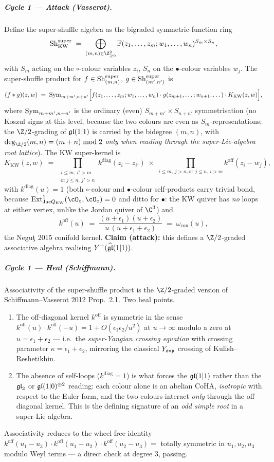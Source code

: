\subparagraph{Cycle 1 --- Attack (Vasserot).} Define the super-shuffle
algebra as the bigraded symmetric-function ring
\[
  \Sh^{\mathrm{super}}_{\mathrm{KW}}
  \;=\;
  \bigoplus_{(m,n)\in\Z_{\geq 0}^2}
  \mathbb F(z_1,\dots,z_m; w_1,\dots,w_n)^{S_m\times S_n},
\]
with $S_m$ acting on the $\circ$-colour variables $z_i$, $S_n$ on the
$\bullet$-colour variables $w_j$. The super-shuffle product for
$f\in\mathrm{Sh}^{\mathrm{super}}_{(m,n)}$, $g\in\mathrm{Sh}^{\mathrm{super}}_{(m',n')}$ is
\[
  (f\ast g)(z,w)
  \;=\;
  \mathrm{Sym}_{m+m',n+n'}
  \Bigl[f(z_1,\dots,z_m;w_1,\dots,w_n)\cdot g(z_{m+1},\dots;w_{n+1},\dots)
       \cdot K_{\mathrm{KW}}(z,w)\Bigr],
\]
where $\mathrm{Sym}_{m+m',n+n'}$ is the ordinary (even) $S_{m+m'}\times S_{n+n'}$
symmetrisation (no Koszul signs at this level, because the two colours
are even as $S_m$-representations; the $\Z/2$-grading of $\mathfrak{gl}(1|1)$ is
carried by the bidegree $(m,n)$, with $\deg_{\Z/2}(m,n) = (m+n)\bmod 2$
\emph{only when reading through the super-Lie-algebra root lattice}). The
KW super-kernel is
\[
  K_{\mathrm{KW}}(z,w)
  \;=\;
  \prod_{\substack{i\leq m,\,i'>m\\\text{or}\ j\leq n,\,j'>n}}
   k^{\mathrm{diag}}(z_i-z_{i'})
  \;\times\;
  \prod_{i\leq m,\,j>n,\text{or }j\leq n,\,i>m}
   k^{\mathrm{off}}(z_i-w_j),
\]
with $k^{\mathrm{diag}}(u) = 1$ (both $\circ$-colour and $\bullet$-colour
self-products carry trivial bond, because $\mathrm{Ext}^1_{\Jac
Q_{\mathrm{KW}}}(\cO_\circ, \cO_\circ) = 0$ and ditto for $\bullet$: the
KW quiver has \emph{no} loops at either vertex, unlike the Jordan quiver
of $\C^3$) and
\[
  k^{\mathrm{off}}(u) \;=\;
  \frac{(u+\epsilon_1)(u+\epsilon_2)}{u\,(u+\epsilon_1+\epsilon_2)}
  \;=\;
  \omega_{\mathrm{con}}(u),
\]
the Negu\c{t} 2015 conifold kernel. \textbf{Claim (attack):} this defines a
$\Z/2$-graded associative algebra realising $Y^+(\widehat{\mathfrak{gl}}(1|1))$.

\subparagraph{Cycle 1 --- Heal (Schiffmann).} Associativity of the
super-shuffle product is the $\Z/2$-graded version of Schiffmann--Vasserot
2012 Prop.~2.1. Two heal points.
\begin{enumerate}
  \item The off-diagonal kernel $k^{\mathrm{off}}$ is symmetric in the
  sense $k^{\mathrm{off}}(u)\cdot k^{\mathrm{off}}(-u) = 1 + O(\epsilon_1
  \epsilon_2/u^2)$ at $u\to\infty$ modulo a zero at $u=\epsilon_1+
  \epsilon_2$ --- i.e.\ the \emph{super-Yangian crossing equation} with
  crossing parameter $\kappa = \epsilon_1+\epsilon_2$, mirroring
  the classical $Y_{\mathfrak{osp}}$ crossing of Kulish--Reshetikhin.
  \item The absence of self-loops ($k^{\mathrm{diag}}=1$) is what forces the
  $\mathfrak{gl}(1|1)$ rather than the $\mathfrak{gl}_2$ or $\mathfrak{gl}(1|0)^{\oplus 2}$ reading:
  each colour alone is an abelian CoHA, \emph{isotropic} with respect to
  the Euler form, and the two colours interact \emph{only} through the
  off-diagonal kernel. This is the defining signature of an
  \emph{odd simple root} in a super-Lie algebra.
\end{enumerate}
Associativity reduces to the wheel-free identity $k^{\mathrm{off}}(u_1-
u_3)\cdot k^{\mathrm{off}}(u_1-u_2)\cdot k^{\mathrm{off}}(u_2-u_3) =$
totally symmetric in $u_1,u_2,u_3$ modulo Weyl terms --- a direct check at
degree $3$, passing.

